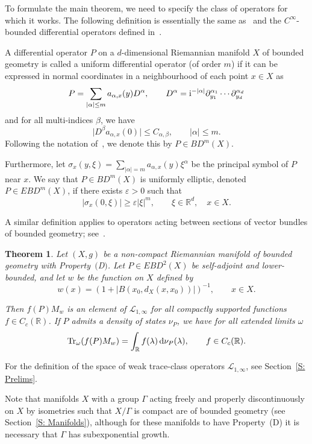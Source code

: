 \documentclass[pdftex]{sigma}
\numberwithin{equation}{section}
\newtheorem{Theorem}{Theorem}[section]
\newcommand{\abs}[1]{\lvert#1\rvert}
\begin{document}
To formulate the main theorem, we need to specify the class of operators for which it works. The following definition is essentially the same as~\cite{Kordyukov1991} and the $C^\infty$-bounded differential operators defined in~\cite[Appendix 1]{Shubin1992}.
\begin{Definition}%
A differential operator $P$ on a $d$-dimensional Riemannian manifold $X$ of bounded geometry is called a uniform differential operator (of order $m$) if it can be expressed in normal coordinates in a neighbourhood of each point $x \in X$ as
\[
P = \sum_{|\alpha|\leq m} a_{\alpha, x}(y) D^\alpha,\qquad D^{\alpha} = {\rm i}^{-|\alpha|}\partial_{y_1}^{\alpha_1}\cdots \partial_{y_d}^{\alpha_d}
\]
and for all multi-indices $\beta$, we have
\[
\big\lvert D^\beta a_{\alpha, x}(0)\big\rvert \leq C_{\alpha, \beta}, \qquad \abs{\alpha}\leq m.
\]
Following the notation of~\cite{Kordyukov1991}, we denote this by $P \in BD^m(X)$.

Furthermore, let $\sigma_x(y, \xi) = \sum_{\abs{\alpha}=m} a_{\alpha, x}(y) \xi^\alpha$ be the principal symbol of $P$ near $x.$ We say that $P \in BD^m(X)$ is uniformly elliptic, denoted $P\in EBD^m(X)$, if there exists $\varepsilon>0$ such that
\[
\abs{\sigma_x(0,\xi)}\geq \varepsilon \abs{\xi}^m,\qquad \xi\in \mathbb{R}^d,\quad x\in X.
\]
\end{Definition}
A similar definition applies to operators acting between sections of vector bundles of bounded geometry; see~\cite{Shubin1992}.



\begin{Theorem}\label{T: main manifold thm}
 Let $(X,g)$ be a non-compact Riemannian manifold of bounded geometry with Property~$($D$)$. Let $P \in EBD^2(X)$ be self-adjoint and lower-bounded, and let $w$ be the function on $X$ defined by \[ w(x) = (1+\abs{B(x_0,d_X(x,x_0))})^{-1},\qquad x \in X.\]

 Then $f(P)M_w$ is an element of $\mathcal{L}_{1,\infty}$ for all compactly supported functions $f\in C_c(\mathbb{R})$. If $P$ admits a density of states $\nu_P$, we have for all extended limits $\omega$
 \[
 \mathrm{Tr}_{\omega}(f(P)M_w) = \int_{\mathbb{R}} f(\lambda)\, {\rm d}\nu_P(\lambda), \qquad f\in C_c(\mathbb{R}).
 \]
\end{Theorem}
For the definition of the space of weak trace-class operators $\mathcal{L}_{1,\infty}$, see Section~\ref{S: Prelims}.

Note that manifolds $X$ with a group $\Gamma$ acting freely and properly discontinuously on $X$ by isometries such that $X/\Gamma$ is compact are of bounded geometry (see Section~\ref{S: Manifolds}), although for these manifolds to have Property~(D) it is necessary that $\Gamma$ has subexponential growth.
\end{document}
